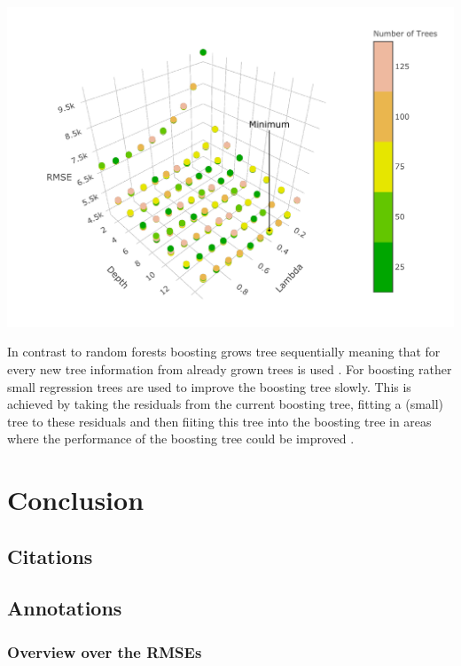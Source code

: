 \documentclass[11pt,]{article}
\begin{document}
\includegraphics{../00_data/output_paper/11_boosting_plot.pdf}

In contrast to random forests boosting grows tree sequentially meaning
that for every new tree information from already grown trees is used
\autocite[p.322]{James2014}. For boosting rather small regression trees
are used to improve the boosting tree slowly. This is achieved by taking
the residuals from the current boosting tree, fitting a (small) tree to
these residuals and then fiiting this tree into the boosting tree in
areas where the performance of the boosting tree could be improved
\autocite[p.322]{James2014}.

\hypertarget{conclusion}{%
\section{Conclusion}\label{conclusion}}

\pagebreak

\hypertarget{citations}{%
\subsection{Citations}\label{citations}}

\pagebreak

\hypertarget{annotations}{%
\subsection{Annotations}\label{annotations}}

\hypertarget{overview-over-the-rmses}{%
\subsubsection{Overview over the RMSEs}\label{overview-over-the-rmses}}
\end{document}
